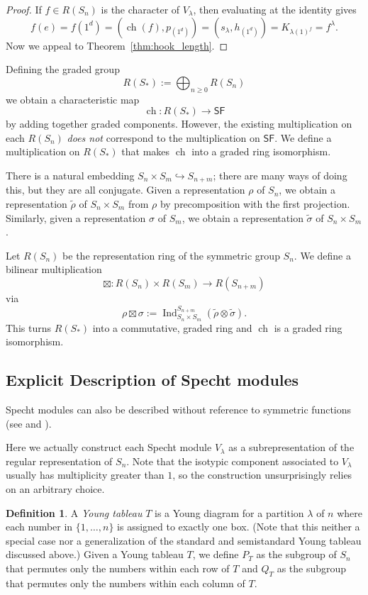 \documentclass[12pt]{article}
\theoremstyle{plain}
\theoremstyle{definition}
\newtheorem{definition}[theorem]{Definition}
\theoremstyle{remark}
\numberwithin{equation}{section}
\begin{document}
\begin{proof}
If $f \in R(S_n)$ is the character of $V_\lambda$,
then evaluating at the identity gives
\[
f(e)=f(1^d)= ( \operatorname{ch}(f), p_{(1^d)} )
= (s_\lambda, h_{(1^d)}) = K_{\lambda(1)^f}=f^\lambda.
\]
Now we appeal to Theorem~\ref{thm:hook_length}.
\end{proof}

Defining the graded group
\[
R(S_\ast) := \bigoplus_{n \ge 0} R(S_n)
\]
we obtain a characteristic map
\[
\operatorname{ch} : R(S_\ast) \to \mathsf{SF}
\]
by adding together graded components.
However, the existing multiplication on each $R(S_n)$
\emph{does not} correspond to the multiplication on $\mathsf{SF}$.
We define a multiplication on $R(S_\ast)$ that makes
$\operatorname{ch}$ into a graded ring isomorphism.

There is a natural embedding $S_n \times S_m \hookrightarrow S_{n+m}$;
there are many ways of doing this, but they are all conjugate.
Given a representation $\rho$ of $S_n$, we obtain a representation
$\widetilde{\rho}$ of $S_n \times S_m$ from $\rho$ by precomposition
with the first projection.  Similarly, given a representation $\sigma$
of $S_m$, we obtain a representation $\widetilde{\sigma}$ of
$S_n \times S_m$.

Let $R(S_n)$ be the representation ring of the symmetric group $S_n$. 
We define a bilinear multiplication
\[ \boxtimes : R(S_n) \times R(S_m) \to R(S_{n+m}) \]
via
\[
\rho \boxtimes \sigma := \operatorname{Ind}_{S_n \times S_m}^{S_{n+m}}
(\widetilde{\rho} \otimes \widetilde{\sigma}).
\]
This turns $R(S_\ast)$ into a commutative, graded ring
and $\operatorname{ch}$ is a graded ring isomorphism.

\subsection{Explicit Description of Specht modules}

Specht modules can also be described without
reference to symmetric functions
(see \cite[\S{4}]{FultonHarris} and \cite[\S{5.11-17}]{Etingof}).

Here we actually construct each Specht module $V_\lambda$
as a subrepresentation of the regular representation of $S_n$.
Note that the isotypic component associated to $V_\lambda$ usually has
multiplicity greater than $1$, so the construction unsurprisingly relies
on an arbitrary choice.

\begin{definition}
A \emph{Young tableau} $T$ is a Young diagram for a partition $\lambda$
of $n$ where each number in $\{1,\ldots,n\}$ is assigned to exactly one
box.  (Note that this neither a special case nor a generalization
of the standard and semistandard Young tableau discussed above.)
Given a Young tableau $T$, we define $P_T$ as the
subgroup of $S_n$ that permutes only the numbers within each row of $T$
and $Q_T$ as the subgroup that permutes only the numbers within each
column of $T$.  
\end{definition}
\end{document}
